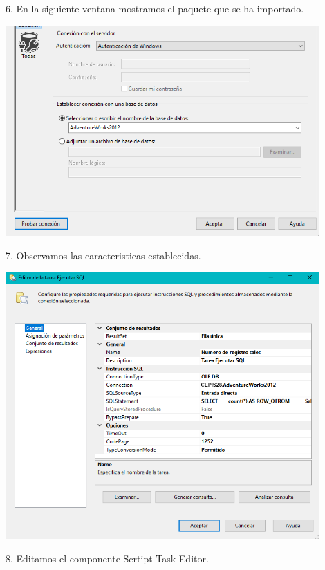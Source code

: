 6. En la siguiente ventana mostramos el paquete que se ha importado.\\
	\begin{center}
	\includegraphics[width=12cm]{./Imagenes/img19}
	\end{center}	
7. Observamos las caracteristicas establecidas.\\
	\begin{center}
	\includegraphics[width=12cm]{./Imagenes/img20}
	\end{center}	
8. Editamos el componente Scrtipt Task Editor.\\
